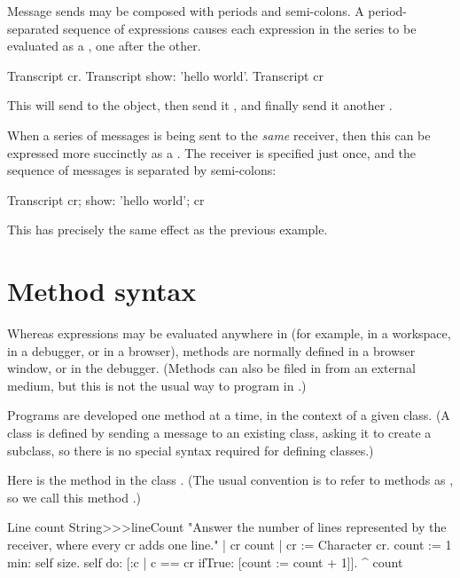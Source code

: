 \documentclass[a4paper,10pt,twoside]{book}
\begin{document}
Message sends may be composed with periods and semi-colons. A period-separated sequence of expressions causes each expression in the series to be evaluated as a , one after the other.

\begin{code}{}
Transcript cr.
Transcript show: 'hello world'.
Transcript cr
\end{code}

\noindent
This will send  to the  object, then send it , and finally send it another .

When a series of messages is being sent to the \emph{same} receiver, then this can be expressed more succinctly as a .
The receiver is specified just once, and the sequence of messages is separated by semi-colons:

\begin{code}{}
Transcript cr;
    show: 'hello world';
    cr
\end{code}
This has precisely the same effect as the previous example.

\section{Method syntax}

Whereas expressions may be evaluated anywhere in \pharo (for example, in a workspace, in a debugger, or in a browser), methods are normally defined in a browser window, or in the debugger.
(Methods can also be filed in from an external medium, but this is not the usual way to program in \pharo.)

Programs are developed one method at a time, in the context of a given class.
(A class is defined by sending a message to an existing class, asking it to create a subclass, so there is no special syntax required for defining classes.)

Here is the method  in the class .
(The usual convention is to refer to methods as , so we call this method .)

\begin{method}[lineCount]{Line count}
String>>>lineCount
   "Answer the number of lines represented by the receiver,
   where every cr adds one line."
   | cr count |
   cr := Character cr.
   count := 1 min: self size.
   self do:
      [:c | c == cr ifTrue: [count := count + 1]].
   ^ count
\end{method}
\end{document}
